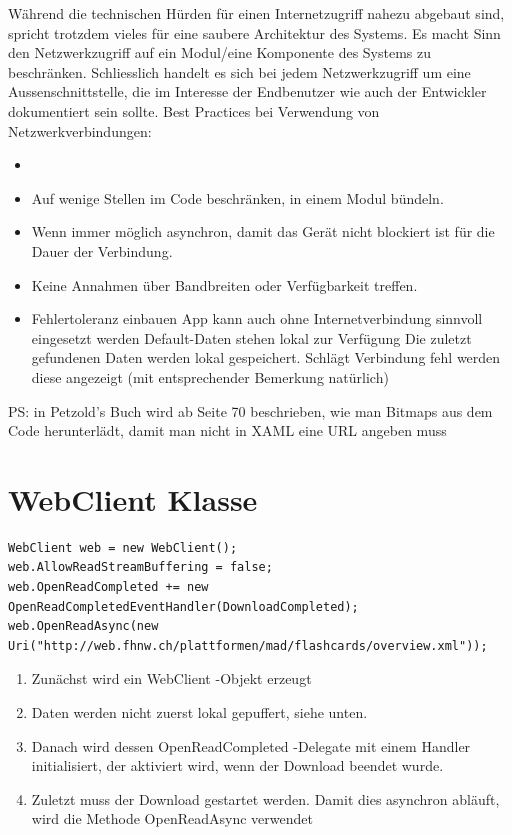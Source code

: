 \documentclass[a4paper,10pt]{scrreprt}
\begin{document}
Während die technischen Hürden für einen Internetzugriff nahezu abgebaut sind, spricht trotzdem vieles für
eine saubere Architektur des Systems. Es macht Sinn den Netzwerkzugriff auf ein Modul/eine Komponente des
Systems zu beschränken. Schliesslich handelt es sich bei jedem Netzwerkzugriff um eine Aussenschnittstelle, die
im Interesse der Endbenutzer wie auch der Entwickler dokumentiert sein sollte.
Best Practices bei Verwendung von Netzwerkverbindungen:
\begin{itemize}
 \item
\item Auf wenige Stellen im Code beschränken, in einem Modul bündeln.
\item Wenn immer möglich asynchron, damit das Gerät nicht blockiert ist für die Dauer der Verbindung.
\item Keine Annahmen über Bandbreiten oder Verfügbarkeit treffen.
\item Fehlertoleranz einbauen
\subitem  App kann auch ohne Internetverbindung sinnvoll eingesetzt werden
\subitem  Default-Daten stehen lokal zur Verfügung
\subitem Die zuletzt gefundenen Daten werden lokal gespeichert. Schlägt Verbindung fehl werden diese
angezeigt (mit entsprechender Bemerkung natürlich)
\end{itemize}

PS: in Petzold’s Buch wird ab Seite 70 beschrieben, wie man Bitmaps aus dem Code herunterlädt, damit man
nicht in XAML eine URL angeben muss

\section{WebClient Klasse}
\begin{lstlisting}[caption=Webclient]
WebClient web = new WebClient();
web.AllowReadStreamBuffering = false;
web.OpenReadCompleted += new OpenReadCompletedEventHandler(DownloadCompleted);
web.OpenReadAsync(new Uri("http://web.fhnw.ch/plattformen/mad/flashcards/overview.xml"));
\end{lstlisting}
\begin{enumerate}
\item Zunächst wird ein WebClient -Objekt erzeugt
\item  Daten werden nicht zuerst lokal gepuffert, siehe unten.
\item Danach wird dessen OpenReadCompleted -Delegate mit einem Handler initialisiert, der aktiviert wird,
wenn der Download beendet wurde.
\item Zuletzt muss der Download gestartet werden. Damit dies asynchron abläuft, wird die Methode
OpenReadAsync verwendet
\end{enumerate}
\end{document}
